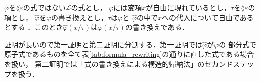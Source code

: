 	\begin{screen}
		\begin{metathm}[書き換えへの代入は代入した式の書き換え]
		\label{metathm:substitution_to_rewritten_formula}
			$\varphi$を$\lang{\varepsilon}$の式ではない$\mathcal{L}$の式とし，
			$\varphi$には変項$x$が自由に現れているとし，$\tau$を$\lang{\varepsilon}$の項とし，
			$\widehat{\varphi}$を$\varphi$の書き換えとし，$\tau$は$\varphi$と
			$\widehat{\varphi}$の中で$x$への代入について自由であるとする\footnotemark
			．このとき$\widehat{\varphi}(x/\tau)$は$\varphi(x/\tau)$の書き換えである．
		\end{metathm}
	\end{screen}
	
	
	証明が長いので第一証明と第二証明に分割する．第一証明では$\widehat{\varphi}$が$\varphi$の
	部分式で原子式であるものを全て表\ref{tab:formula_rewriting}の通りに直した式である場合を扱い，
	第二証明では「式の書き換えによる構造的帰納法」のセカンドステップを扱う．
	
